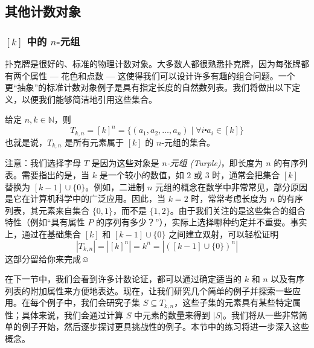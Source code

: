 
\subsection{其他计数对象}

\subsubsection*{$[k]$ 中的 $n$-元组}

扑克牌是很好的、标准的物理计数对象。大多数人都很熟悉扑克牌，因为每张牌都有两个属性 --- 花色和点数 --- 这使得我们可以设计许多有趣的组合问题。一个更``抽象''的标准计数对象例子是具有指定长度的自然数列表。我们将做出以下定义，以便我们能够简洁地引用这些集合。

\begin{definition}
    给定 $n,k \in \mathbb{N}$，则
    \[T_{k,n} = [k]^n = \{(a_1, a_2, \dots , a_n) \mid \forall i \centerdot a_i \in [k]\}\]
    也就是说，$T_{k,n}$ 是所有元素属于 $[k]$ 的 $n$-元组的集合。
\end{definition}

注意：我们选择字母 $T$ 是因为这些对象是 \emph{$n$-元组 (Turple)}，即长度为 $n$ 的有序列表。需要指出的是，当 $k$ 是一个较小的数值，如 $2$ 或 $3$ 时，通常会把集合 $[k]$ 替换为 $[k - 1] \cup \{0\}$。例如，二进制 $n$ 元组的概念在数学中非常常见，部分原因是它在计算机科学中的广泛应用。因此，当 $k = 2$ 时，常常考虑长度为 $n$ 的有序列表，其元素来自集合 $\{0, 1\}$，而不是 $\{1, 2\}$。由于我们关注的是这些集合的组合特性（例如``具有属性 $P$ 的序列有多少？''），实际上选择哪种约定并不重要。事实上，通过在基础集合 $[k]$ 和 $[k - 1] \cup \{0\}$ 之间建立双射，可以轻松证明
\[|T_{k,n}| = |[k]^n| = k^n = |([k - 1] \cup \{0\})^n|\]
这部分留给你来完成$\smiley{}$

在下一节中，我们会看到许多计数论证，都可以通过确定适当的 $k$ 和 $n$ 以及有序列表的附加属性来方便地表达。现在，让我们研究几个简单的例子并探索一些应用。在每个例子中，我们会研究子集 $S \subseteq T_{k,n}$，这些子集的元素具有某些特定属性；具体来说，我们会通过计算 $S$ 中元素的数量来得到 $|S|$。我们将从一些非常简单的例子开始，然后逐步探讨更具挑战性的例子。本节中的练习将进一步深入这些概念。\\

